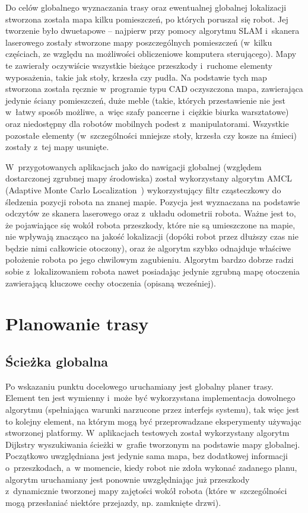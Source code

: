 Do celów globalnego wyznaczania trasy oraz ewentualnej globalnej lokalizacji stworzona
została mapa kilku pomieszczeń, po których poruszał się robot. Jej tworzenie było
dwuetapowe -- najpierw przy pomocy algorytmu SLAM i~skanera laserowego zostały
stworzone mapy poszczególnych pomieszczeń (w~kilku częściach, ze względu na możliwości
obliczeniowe komputera sterującego). Mapy te zawierały oczywiście wszystkie bieżące
przeszkody i~ruchome elementy wyposażenia, takie jak stoły, krzesła czy pudła.
Na podstawie tych map stworzona została ręcznie w~programie typu CAD oczyszczona
mapa, zawierająca jedynie ściany pomieszczeń, duże meble (takie, których przestawienie
nie jest w~łatwy sposób możliwe, a~więc szafy pancerne i~ciężkie biurka warsztatowe)
oraz niedostępny dla robotów mobilnych podest z~manipulatorami. Wszystkie pozostałe
elementy (w~szczególności mniejsze stoły, krzesła czy kosze na śmieci) zostały z~tej
mapy usunięte.

W~przygotowanych aplikacjach jako do nawigacji globalnej (względem dostarczonej
zgrubnej mapy środowiska) został wykorzystany algorytm AMCL (Adaptive Monte Carlo
Localization~\cite{fox2001kld}) wykorzystujący filtr cząsteczkowy do śledzenia
pozycji robota na znanej mapie. Pozycja jest wyznaczana na podstawie odczytów
ze skanera laserowego oraz z~układu odometrii robota. Ważne jest to, że pojawiające
się wokół robota przeszkody, które nie są umieszczone na mapie, nie wpływają znacząco
na jakość lokalizacji (dopóki robot przez dłuższy czas nie będzie nimi całkowicie
otoczony), oraz że algorytm szybko odnajduje właściwe położenie robota po jego
chwilowym zagubieniu. Algorytm bardzo dobrze radzi sobie z~lokalizowaniem robota nawet
posiadając jedynie zgrubną mapę otoczenia zawierającą kluczowe cechy otoczenia
(opisaną wcześniej).

\section{Planowanie trasy}

\subsection{Ścieżka globalna}

Po wskazaniu punktu docelowego uruchamiany jest globalny planer trasy. Element ten
jest wymienny i~może być wykorzystana implementacja dowolnego algorytmu (spełniająca
warunki narzucone przez interfejs systemu), tak więc jest to kolejny element, na którym
mogą być przeprowadzane eksperymenty używając stworzonej platformy. W~aplikacjach
testowych został wykorzystany algorytm Dijkstry wyszukiwania ścieżki w~grafie tworzonym
na podstawie mapy globalnej. Początkowo uwzględniana jest jedynie sama mapa, bez
dodatkowej informacji o~przeszkodach, a~w momencie, kiedy robot nie zdoła wykonać
zadanego planu, algorytm uruchamiany jest ponownie uwzględniając już przeszkody
z~dynamicznie tworzonej mapy zajętości wokół robota (które w~szczególności mogą
przesłaniać niektóre przejazdy, np. zamknięte drzwi).

